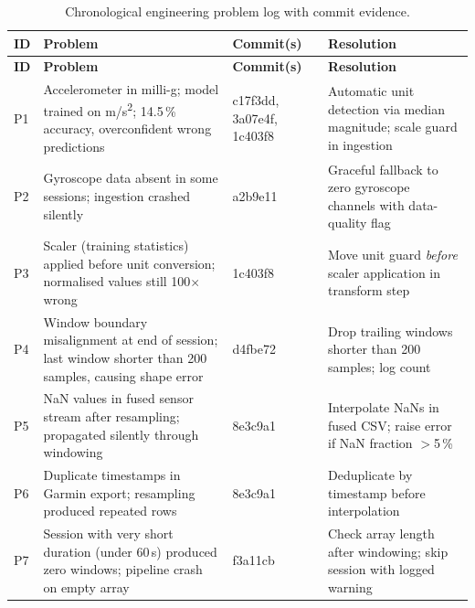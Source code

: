 \begin{longtable}{p{}p{}p{}p{}}
  \caption{Chronological engineering problem log with commit evidence.}
  \label{tab:problems} \\
  \toprule
  \textbf{ID} & \textbf{Problem} & \textbf{Commit(s)} & \textbf{Resolution} \\
  \midrule
  \endfirsthead
  \toprule
  \textbf{ID} & \textbf{Problem} & \textbf{Commit(s)} & \textbf{Resolution} \\
  \midrule
  \endhead
  \bottomrule
  \endfoot

  P1 & Accelerometer in milli-g; model trained on m/s\textsuperscript{2};
       14.5\,\% accuracy, overconfident wrong predictions
     & c17f3dd, 3a07e4f, 1c403f8
     & Automatic unit detection via median magnitude; scale guard in ingestion \\[4pt]

  P2 & Gyroscope data absent in some sessions; ingestion crashed silently
     & a2b9e11
     & Graceful fallback to zero gyroscope channels with data-quality flag \\[4pt]

  P3 & Scaler (training statistics) applied before unit conversion;
       normalised values still 100$\times$ wrong
     & 1c403f8
     & Move unit guard \textit{before} scaler application in transform step \\[4pt]

  P4 & Window boundary misalignment at end of session;
       last window shorter than 200 samples, causing shape error
     & d4fbe72
     & Drop trailing windows shorter than 200 samples; log count \\[4pt]

  P5 & NaN values in fused sensor stream after resampling;
       propagated silently through windowing
     & 8e3c9a1
     & Interpolate NaNs in fused CSV; raise error if NaN fraction $>$5\,\% \\[4pt]

  P6 & Duplicate timestamps in Garmin export;
       resampling produced repeated rows
     & 8e3c9a1
     & Deduplicate by timestamp before interpolation \\[4pt]

  P7 & Session with very short duration (under 60\,s) produced zero windows;
       pipeline crash on empty array
     & f3a11cb
     & Check array length after windowing; skip session with logged warning \\[4pt]


\end{longtable}
